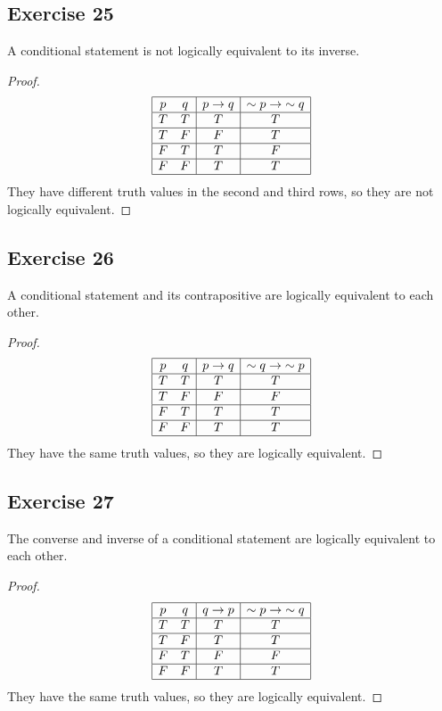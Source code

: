 \documentclass[14pt]{extarticle}
\begin{document}
\subsection{Exercise 25}
A conditional statement is not logically equivalent to its inverse.

\begin{proof}
$$
\begin{array}{|cc|c|c|}
\hline
p & q & p \to q & {\sim p} \to {\sim q} \\
\hline
T & T & T & T \\
\hline
T & F & F & T \\
\hline
F & T & T & F \\
\hline
F & F & T & T \\
\hline
\end{array}
$$
They have different truth values in the second and third rows, so they are not
logically equivalent.
\end{proof}

\subsection{Exercise 26}
A conditional statement and its contrapositive are logically equivalent to each
other.

\begin{proof}
$$
\begin{array}{|cc|c|c|}
\hline
p & q & p \to q & {\sim q} \to {\sim p} \\
\hline
T & T & T & T \\
\hline
T & F & F & F \\
\hline
F & T & T & T \\
\hline
F & F & T & T \\
\hline
\end{array}
$$
They have the same truth values, so they are logically equivalent.
\end{proof}

\subsection{Exercise 27}
The converse and inverse of a conditional statement are logically equivalent to
each other.

\begin{proof}
$$
\begin{array}{|cc|c|c|}
\hline
p & q & q \to p & {\sim p} \to {\sim q} \\
\hline
T & T & T & T \\
\hline
T & F & T & T \\
\hline
F & T & F & F \\
\hline
F & F & T & T \\
\hline
\end{array}
$$
They have the same truth values, so they are logically equivalent.
\end{proof}
\end{document}
